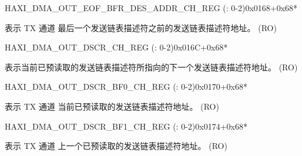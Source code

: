 \begin{register}{H}{AXI\_DMA\_OUT\_EOF\_BFR\_DES\_ADDR\_CH\_REG (: 0-2)}{0x0168+0x68*}\label{regdesc:AXIDMAOUTEOFBFRDESADDRCHNREG}
%
\regnewline%
\begin{regdesc}\begin{reglist}
\label{fielddesc:AXIDMAOUTEOFBFRDESADDRCHN}\item [AXI\_DMA\_OUT\_EOF\_BFR\_DES\_ADDR\_CH\regindex{n}] 表示 TX 通道  最后一个发送链表描述符之前的发送链表描述符地址。 (RO)
\end{reglist}\end{regdesc}
\end{register}


\begin{register}{H}{AXI\_DMA\_OUT\_DSCR\_CH\_REG (: 0-2)}{0x016C+0x68*}\label{regdesc:AXIDMAOUTDSCRCHNREG}
%
\regnewline%
\begin{regdesc}\begin{reglist}
\label{fielddesc:AXIDMAOUTLINKDSCRCHN}\item [AXI\_DMA\_OUTLINK\_DSCR\_CH\regindex{n}] 表示当前已预读取的发送链表描述符所指向的下一个发送链表描述符地址。 (RO)
\end{reglist}\end{regdesc}
\end{register}


\begin{register}{H}{AXI\_DMA\_OUT\_DSCR\_BF0\_CH\_REG (: 0-2)}{0x0170+0x68*}\label{regdesc:AXIDMAOUTDSCRBF0CHNREG}
%
\regnewline%
\begin{regdesc}\begin{reglist}
\label{fielddesc:AXIDMAOUTLINKDSCRBF0CHN}\item [AXI\_DMA\_OUTLINK\_DSCR\_BF0\_CH\regindex{n}] 表示 TX 通道  当前已预读取的发送链表描述符地址。 (RO)
\end{reglist}\end{regdesc}
\end{register}


\begin{register}{H}{AXI\_DMA\_OUT\_DSCR\_BF1\_CH\_REG (: 0-2)}{0x0174+0x68*}\label{regdesc:AXIDMAOUTDSCRBF1CHNREG}
%
\regnewline%
\begin{regdesc}\begin{reglist}
\label{fielddesc:AXIDMAOUTLINKDSCRBF1CHN}\item [AXI\_DMA\_OUTLINK\_DSCR\_BF1\_CH\regindex{n}] 表示 TX 通道  上一个已预读取的发送链表描述符地址。 (RO)
\end{reglist}\end{regdesc}
\end{register}


